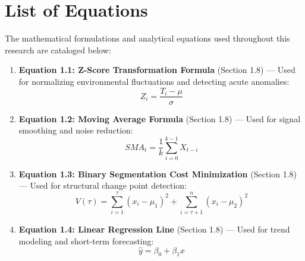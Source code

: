 \documentclass[12pt,a4paper]{report}
\begin{document}
\chapter*{List of Equations}
The mathematical formulations and analytical equations used throughout this research are cataloged below:
\begin{enumerate}
    \item \textbf{Equation 1.1: Z-Score Transformation Formula} (Section 1.8) --- Used for normalizing environmental fluctuations and detecting acute anomalies:
    \begin{equation*}
        Z_i = \frac{T_i - \mu}{\sigma}
    \end{equation*}
    \item \textbf{Equation 1.2: Moving Average Formula} (Section 1.8) --- Used for signal smoothing and noise reduction:
    \begin{equation*}
        SMA_t = \frac{1}{k} \sum_{i=0}^{k-1} X_{t-i}
    \end{equation*}
    \item \textbf{Equation 1.3: Binary Segmentation Cost Minimization} (Section 1.8) --- Used for structural change point detection:
    \begin{equation*}
        V(\tau) = \sum_{i=1}^{\tau} (x_i - \mu_1)^2 + \sum_{i=\tau+1}^{n} (x_i - \mu_2)^2
    \end{equation*}
    \item \textbf{Equation 1.4: Linear Regression Line} (Section 1.8) --- Used for trend modeling and short-term forecasting:
    \begin{equation*}
        \hat{y} = \beta_0 + \beta_1 x
    \end{equation*}
\end{enumerate}
\end{document}
